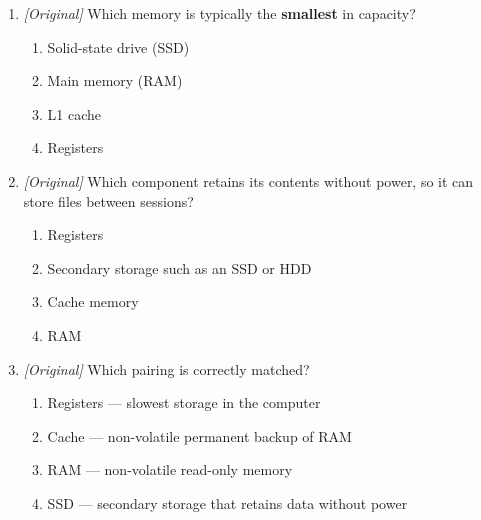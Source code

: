 \documentclass[11pt]{article}
\begin{document}
\begin{enumerate}[label=\textbf{Q\arabic*.}, leftmargin=*]
\begin{enumerate}[label=\Alph*.]
  \end{enumerate}
\item \textit{[Original]} Which memory is typically the \textbf{smallest} in
  capacity?
  \begin{enumerate}[label=\Alph*.]
    \item Solid-state drive (SSD)
    \item Main memory (RAM)
    \item L1 cache
    \item Registers
  \end{enumerate}
\item \textit{[Original]} Which component retains its contents without
  power, so it can store files between sessions?
  \begin{enumerate}[label=\Alph*.]
    \item Registers
    \item Secondary storage such as an SSD or HDD
    \item Cache memory
    \item RAM
  \end{enumerate}
\item \textit{[Original]} Which pairing is correctly matched?
  \begin{enumerate}[label=\Alph*.]
    \item Registers --- slowest storage in the computer
    \item Cache --- non-volatile permanent backup of RAM
    \item RAM --- non-volatile read-only memory
    \item SSD --- secondary storage that retains data without power
  \end{enumerate}


\end{enumerate}
\end{document}
